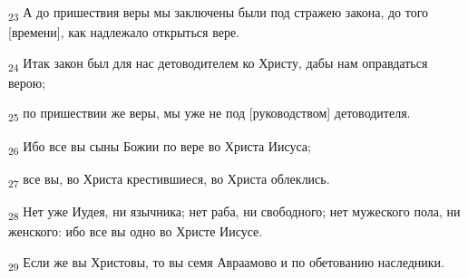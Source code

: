 \begin{tcolorbox}
\textsubscript{23} А до пришествия веры мы заключены были под стражею закона, до того [времени], как надлежало открыться вере.
\end{tcolorbox}
\begin{tcolorbox}
\textsubscript{24} Итак закон был для нас детоводителем ко Христу, дабы нам оправдаться верою;
\end{tcolorbox}
\begin{tcolorbox}
\textsubscript{25} по пришествии же веры, мы уже не под [руководством] детоводителя.
\end{tcolorbox}
\begin{tcolorbox}
\textsubscript{26} Ибо все вы сыны Божии по вере во Христа Иисуса;
\end{tcolorbox}
\begin{tcolorbox}
\textsubscript{27} все вы, во Христа крестившиеся, во Христа облеклись.
\end{tcolorbox}
\begin{tcolorbox}
\textsubscript{28} Нет уже Иудея, ни язычника; нет раба, ни свободного; нет мужеского пола, ни женского: ибо все вы одно во Христе Иисусе.
\end{tcolorbox}
\begin{tcolorbox}
\textsubscript{29} Если же вы Христовы, то вы семя Авраамово и по обетованию наследники.
\end{tcolorbox}
